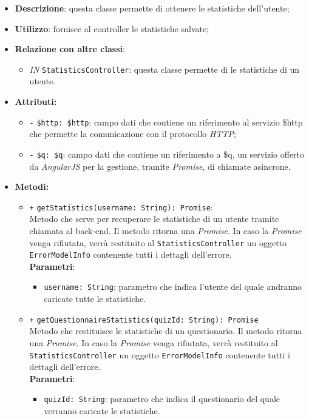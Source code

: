 \begin{itemize}
	\item \textbf{Descrizione}: questa classe permette di ottenere le statistiche dell'utente;
	\item \textbf{Utilizzo}: fornisce al controller le statistiche salvate;
	\item \textbf{Relazione con altre classi}:
	\begin{itemize}
		\item \textit{IN} \texttt{StatisticsController}: questa classe permette di le statistiche di un utente.
	\end{itemize}
	\item \textbf{Attributi:}
	\begin{itemize}
		\item \texttt{-} \texttt{\$http: \$http}: campo dati che contiene un riferimento al servizio \$http che permette la comunicazione con il protocollo \textit{HTTP};
		\item \texttt{-} \texttt{\$q: \$q}: campo dati che contiene un riferimento a \$q, un servizio offerto da \textit{AngularJS} per la gestione, tramite \textit{Promise}, di chiamate asincrone.
	\end{itemize}
	\item \textbf{Metodi:}
	\begin{itemize}
		\item \texttt{+} \texttt{getStatistics(username: String): Promise}: \\Metodo che serve per recuperare le statistiche di un utente tramite chiamata al back-end. Il metodo ritorna una \textit{Promise}. In caso la \textit{Promise} venga rifiutata, verrà restituito al \texttt{StatisticsController} un oggetto \texttt{ErrorModelInfo} contenente tutti i dettagli dell'errore. \\
	    \textbf{Parametri}:
		\begin{itemize}
			\item \texttt{username: String}: parametro che indica l'utente del quale andranno caricate tutte le statistiche.
		\end{itemize}
		\item \texttt{+} \texttt{getQuestionnaireStatistics(quizId: String): Promise} \\Metodo che restituisce le statistiche di un questionario.  Il metodo ritorna una \textit{Promise}. In caso la \textit{Promise} venga rifiutata, verrà restituito al \texttt{StatisticsController} un oggetto \texttt{ErrorModelInfo} contenente tutti i dettagli dell'errore. \\
		\textbf{Parametri}:
		\begin{itemize}
			\item \texttt{quizId: String}: parametro che indica il questionario del quale verranno caricate le statistiche.
		\end{itemize}
	\end{itemize}
\end{itemize}

